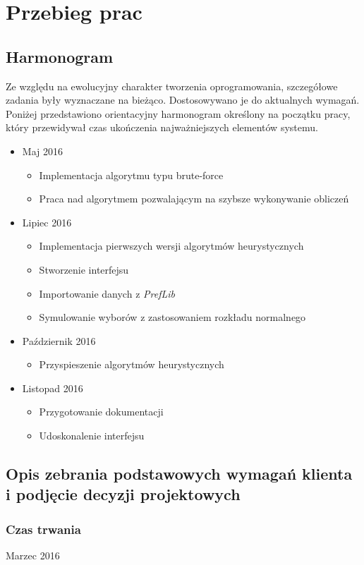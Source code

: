 \documentclass[pdflatex,11pt]{../aghdoc_version2}
\begin{document}
\chapter{Przebieg prac}
\section{Harmonogram}
Ze względu na ewolucyjny charakter tworzenia oprogramowania, szczegółowe zadania były wyznaczane na bieżąco. Dostosowywano je do aktualnych wymagań. Poniżej przedstawiono orientacyjny harmonogram określony na początku pracy, który
przewidywał czas ukończenia najważniejszych elementów systemu.
\begin{itemize}
\item Maj 2016
	\begin{itemize}
	\item Implementacja algorytmu typu brute-force
	\item Praca nad algorytmem pozwalającym na szybsze wykonywanie obliczeń
	\end{itemize}
\item Lipiec 2016
	\begin{itemize}
	\item Implementacja pierwszych wersji algorytmów heurystycznych
	\item Stworzenie interfejsu
	\item Importowanie danych z \textit{PrefLib}
	\item Symulowanie wyborów z zastosowaniem rozkładu normalnego
	\end{itemize}
\item Październik 2016
	\begin{itemize}
	\item Przyspieszenie algorytmów heurystycznych
	\end{itemize}
\item Listopad 2016
	\begin{itemize}
	\item Przygotowanie dokumentacji
	\item Udoskonalenie interfejsu
	\end{itemize}
\end{itemize}

\section{Opis zebrania podstawowych wymagań klienta i podjęcie
decyzji projektowych}

\subsection{Czas trwania}
Marzec 2016
\end{document}
